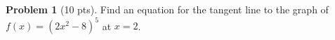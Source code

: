\documentclass[12pt]{article}
\theoremstyle{definition}
\newtheorem{problem}{Problem}
\begin{document}
\begin{problem}[10 pts]
  Find an equation for the tangent line to the graph of $f(x) = (2x^2-8)^5$ at $x=2$.

  \vspace{5cm} 

  \begin{flushright}
  \end{flushright}
\end{problem}
\end{document}
